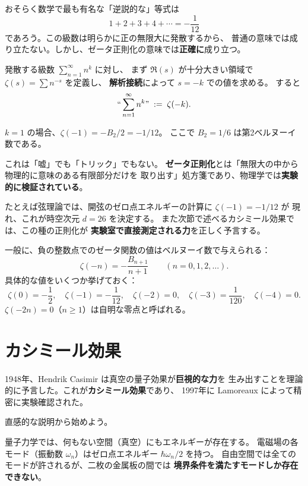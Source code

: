 おそらく数学で最も有名な「逆説的な」等式は
\[
  1 + 2 + 3 + 4 + \cdots = -\frac{1}{12}
\]
であろう。この級数は明らかに正の無限大に発散するから、
普通の意味では成り立たない。しかし、ゼータ正則化の意味では\textbf{正確に}成り立つ。

\begin{dfnbox}[ゼータ正則化]
発散する級数 $\sum_{n=1}^{\infty} n^k$ に対し、
まず $\Re(s)$ が十分大きい領域で $\zeta(s) = \sum n^{-s}$ を定義し、
\textbf{解析接続}によって $s = -k$ での値を求める。
すると
\[
  ``\sum_{n=1}^{\infty} n^k" \;:=\; \zeta(-k).
\]
\end{dfnbox}

$k=1$ の場合、$\zeta(-1) = -B_2/2 = -1/12$。
ここで $B_2 = 1/6$ は第2ベルヌーイ数である。

\begin{hsbox}
これは「嘘」でも「トリック」でもない。
\textbf{ゼータ正則化}とは「無限大の中から物理的に意味のある有限部分だけを
取り出す」処方箋であり、物理学では\textbf{実験的に検証されている}。

たとえば弦理論では、開弦のゼロ点エネルギーの計算に $\zeta(-1)=-1/12$ が
現れ、これが時空次元 $d=26$ を決定する。
また次節で述べるカシミール効果では、この種の正則化が
\textbf{実験室で直接測定される力}を正しく予言する。
\end{hsbox}

一般に、負の整数点でのゼータ関数の値はベルヌーイ数で与えられる：
\[
  \zeta(-n) = -\frac{B_{n+1}}{n+1}
  \qquad (n = 0, 1, 2, \ldots).
\]
具体的な値をいくつか挙げておく：
\[
  \zeta(0) = -\frac{1}{2},\quad
  \zeta(-1) = -\frac{1}{12},\quad
  \zeta(-2) = 0,\quad
  \zeta(-3) = \frac{1}{120},\quad
  \zeta(-4) = 0.
\]
$\zeta(-2n)=0$（$n\geq 1$）は自明な零点と呼ばれる。

\section{カシミール効果}
\label{sec:4.2}

1948年、Hendrik Casimir は真空の量子効果が\textbf{巨視的な力}を
生み出すことを理論的に予言した。これが\textbf{カシミール効果}であり、
1997年に Lamoreaux によって精密に実験確認された。

直感的な説明から始めよう。

量子力学では、何もない空間（真空）にもエネルギーが存在する。
電磁場の各モード（振動数 $\omega_n$）はゼロ点エネルギー $\hbar\omega_n/2$ を持つ。
自由空間では全てのモードが許されるが、二枚の金属板の間では
\textbf{境界条件を満たすモードしか存在できない}。

